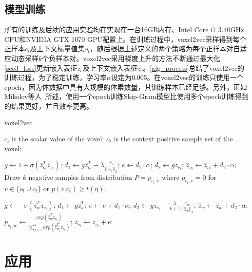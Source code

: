 \subsection{模型训练}

所有的训练及后续的应用实验均在实现在一台16GB内存、Intel Core i7 3.40GHz CPU和NVIDIA GTX 1070 GPU配置上。在训练过程中，voxel2vec采样得到每个正样本$c_t$及上下文标量值集$o_t$，随后根据上述定义的两个策略为每个正样本对自适应动态采样$k$个负样本对。voxel2vec采用梯度上升的方法不断通过最大化\autoref{sec3_loss}更新嵌入表征$z_{c}$及上下文嵌入表征$\hat{z}_{c}$。\autoref{alg_process}总结了voxel2vec的训练过程，为了稳定训练，学习率$\alpha$设定为0.005。在voxel2vec的训练只使用一个epoch，因为体数据中具有大规模的体素数量，其训练样本已经足够。另外，正如Mikolov等人~\cite{MIKOLOV:2013:EEO}所述，使用一个epoch训练Skip-Gram模型比使用多个epoch训练得到的结果更好，并且效率更高。


\begin{algorithm}[t]
	\caption{voxel2vec}
	\begin{algorithmic}[1]
		\State $c_t$ is the scalar value of the voxel;
		\State $o_t$ is the context positive sample set of the voxel;
		
		\State $g \gets 1 - \sigma (\hat{z}_{o_i}^{T} z_{c_t})$;
		\State $d_1 \gets g\hat{z}_{o_i}^{T} - \lambda \frac{z_{c_t}}{||z_{c_t}||_2} $;
		\State $e \gets d_1\cdot \alpha$;
		\State $d_2 \gets gz_{c_t}$;
		\State $\hat{z}_{o_i} \gets \hat{z}_{o_i} + d_2\cdot \alpha$;
		\State Draw $k$ negative samples from distribution $P = p_{c_t, v}$ where $p_{c_t, v} = 0$ for $v\in \{o_t \cup c_t\}$ or $p(v|c_t)\geq t(\eta)$;
		
		\State $g \gets - \sigma (\hat{z}_w^{T} z_{c_t})$;
		\State $d_1 \gets g\hat{z}_w^{T} $;
		\State $e \gets e+d_1\cdot \alpha$;
		\State $d_2 \gets gz_{c_t} - \frac{\lambda}{k+1}\frac{\hat{z}_w}{||\hat{z}_w||_2}$;
		\State $\hat{z}_w \gets \hat{z}_w + d_2\cdot \alpha$;
		\State $p_{c_t,w} \gets \frac{exp(\hat{z}_w^T z_{c_t})}{\sum_{j=1}^{k}exp(\hat{z}_{w_j}^T z_{c_t})}$;
		\EndFor
		\State $z_{c_t} \gets z_{c_t}+e$;
		\EndFor
		
		\EndFor
	\end{algorithmic}
	\label{alg_process}
\end{algorithm}


\section{应用}
